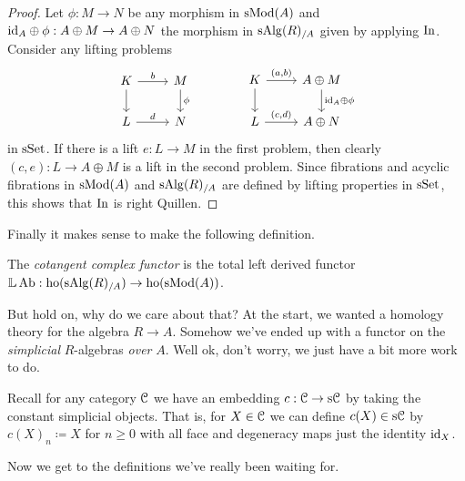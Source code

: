 \begin{proof}
  Let $\phi : M \to N$ be any morphism in $\mathrm{s}\mathrm{Mod}(A)$ and $\mathrm{id}_A
  \oplus \phi: A \oplus M \to A \oplus N$ the morphism in
  $\mathrm{s}\mathrm{Alg}(R)_{/A}$ given by applying $\operatorname{In}$. Consider any lifting
  problems
  \[
  \begin{tikzcd}
    K \rar{b} \dar & M \dar{\phi} \\ L \rar{d} & N
  \end{tikzcd}
  \hspace{40pt}
  \begin{tikzcd}
    K \rar{(a,b)} \dar & A \oplus M \dar{\id_A \oplus \phi} \\ L
    \rar{(c,d)} & A \oplus N
  \end{tikzcd}
  \]
  in $\mathrm{s}\mathrm{Set}$. If there is a lift $e : L \to M$ in the first problem,
  then clearly $(c,e) : L \to A \oplus M$ is a lift in the second
  problem. Since fibrations and acyclic fibrations in $\mathrm{s}\mathrm{Mod}(A)$ and
  $\mathrm{s}\mathrm{Alg}(R)_{/A}$ are defined by lifting properties in $\mathrm{s}\mathrm{Set}$, this
  shows that $\operatorname{In}$ is right Quillen.
\end{proof}

Finally it makes sense to make the following definition.

\newcommand{\Cot}{\mathrm{L}}

\begin{definition}
  The \emph{cotangent complex functor} is the total left derived
  functor $\mathbb{L}\operatorname{Ab} : \operatorname{ho}(\mathrm{s}\mathrm{Alg}(R)_{/A}) \to \operatorname{ho}(\mathrm{s}\mathrm{Mod}(A))$.
\end{definition}

But hold on, why do we care about that? At the start, we wanted a
homology theory for the algebra $R \to A$. Somehow we've ended up with
a functor on the \emph{simplicial} $R$-algebras \emph{over} $A$. Well
ok, don't worry, we just have a bit more work to do.

\begin{nothing}
  \label{constant}
  Recall for any category $\mathcal{C}$ we have an embedding $c : \mathcal{C} \to \mathrm{s}\mathcal{C}$
  by taking the constant simplicial objects. That is, for $X \in \mathcal{C}$
  we can define $c(X) \in \mathrm{s}\mathcal{C}$ by $c(X)_n \coloneqq X$ for $n \ge 0$
  with all face and degeneracy maps just the identity $\mathrm{id}_X$.
\end{nothing}

Now we get to the definitions we've really been waiting for.

\renewcommand{\D}{\mathrm{D}}

